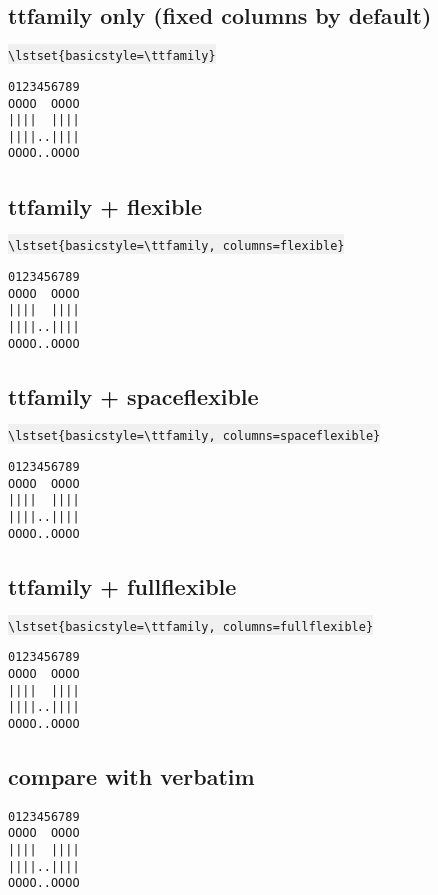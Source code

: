 \documentclass{article}
\newcommand{\bs}{\textbackslash}
\newcommand{\ttt}[1]{\colorbox[HTML]{f0f0f0}{\texttt{#1}}}
\begin{document}
\subsection{ttfamily only (fixed columns by default)}
\ttt{\bs{}lstset\{basicstyle=\bs{}ttfamily\}}

{
\lstset{basicstyle=\ttfamily}
\begin{lstlisting}
0123456789
OOOO  OOOO
||||  ||||
||||..||||
OOOO..OOOO
\end{lstlisting}
}

\subsection{ttfamily + flexible}
\ttt{\bs{}lstset\{basicstyle=\bs{}ttfamily, columns=flexible\}}

{
\lstset{basicstyle=\ttfamily, columns=flexible}
\begin{lstlisting}
0123456789
OOOO  OOOO
||||  ||||
||||..||||
OOOO..OOOO
\end{lstlisting}
}

\subsection{ttfamily + spaceflexible}
\ttt{\bs{}lstset\{basicstyle=\bs{}ttfamily, columns=spaceflexible\}}
{
\lstset{basicstyle=\ttfamily, columns=spaceflexible}
\begin{lstlisting}
0123456789
OOOO  OOOO
||||  ||||
||||..||||
OOOO..OOOO
\end{lstlisting}
}

\subsection{ttfamily + fullflexible}
\ttt{\bs{}lstset\{basicstyle=\bs{}ttfamily, columns=fullflexible\}}

{
\lstset{basicstyle=\ttfamily, columns=fullflexible}
\begin{lstlisting}
0123456789
OOOO  OOOO
||||  ||||
||||..||||
OOOO..OOOO
\end{lstlisting}
}

\subsection{compare with verbatim}
\begin{verbatim}
0123456789
OOOO  OOOO
||||  ||||
||||..||||
OOOO..OOOO
\end{verbatim}
\pagebreak
\end{document}
